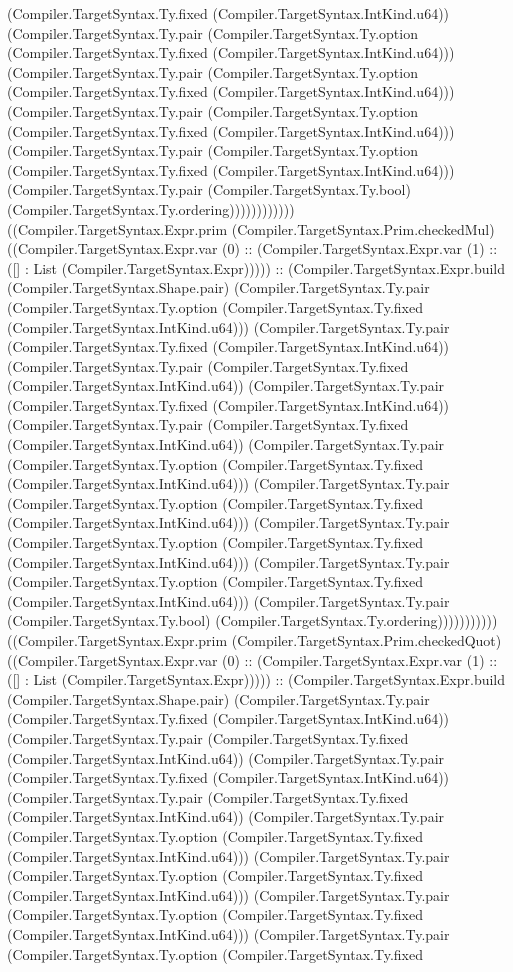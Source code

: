 \documentclass[11pt]{article}
\begin{document}
(Compiler.TargetSyntax.Ty.fixed (Compiler.TargetSyntax.IntKind.u64)) (Compiler.TargetSyntax.Ty.pair (Compiler.TargetSyntax.Ty.option (Compiler.TargetSyntax.Ty.fixed (Compiler.TargetSyntax.IntKind.u64))) (Compiler.TargetSyntax.Ty.pair (Compiler.TargetSyntax.Ty.option (Compiler.TargetSyntax.Ty.fixed (Compiler.TargetSyntax.IntKind.u64))) (Compiler.TargetSyntax.Ty.pair (Compiler.TargetSyntax.Ty.option (Compiler.TargetSyntax.Ty.fixed (Compiler.TargetSyntax.IntKind.u64))) (Compiler.TargetSyntax.Ty.pair (Compiler.TargetSyntax.Ty.option (Compiler.TargetSyntax.Ty.fixed (Compiler.TargetSyntax.IntKind.u64))) (Compiler.TargetSyntax.Ty.pair (Compiler.TargetSyntax.Ty.bool) (Compiler.TargetSyntax.Ty.ordering)))))))))))) ((Compiler.TargetSyntax.Expr.prim (Compiler.TargetSyntax.Prim.checkedMul) ((Compiler.TargetSyntax.Expr.var (0) :: (Compiler.TargetSyntax.Expr.var (1) :: ([] : List (Compiler.TargetSyntax.Expr))))) :: (Compiler.TargetSyntax.Expr.build (Compiler.TargetSyntax.Shape.pair) (Compiler.TargetSyntax.Ty.pair (Compiler.TargetSyntax.Ty.option (Compiler.TargetSyntax.Ty.fixed (Compiler.TargetSyntax.IntKind.u64))) (Compiler.TargetSyntax.Ty.pair (Compiler.TargetSyntax.Ty.fixed (Compiler.TargetSyntax.IntKind.u64)) (Compiler.TargetSyntax.Ty.pair (Compiler.TargetSyntax.Ty.fixed (Compiler.TargetSyntax.IntKind.u64)) (Compiler.TargetSyntax.Ty.pair (Compiler.TargetSyntax.Ty.fixed (Compiler.TargetSyntax.IntKind.u64)) (Compiler.TargetSyntax.Ty.pair (Compiler.TargetSyntax.Ty.fixed (Compiler.TargetSyntax.IntKind.u64)) (Compiler.TargetSyntax.Ty.pair (Compiler.TargetSyntax.Ty.option (Compiler.TargetSyntax.Ty.fixed (Compiler.TargetSyntax.IntKind.u64))) (Compiler.TargetSyntax.Ty.pair (Compiler.TargetSyntax.Ty.option (Compiler.TargetSyntax.Ty.fixed (Compiler.TargetSyntax.IntKind.u64))) (Compiler.TargetSyntax.Ty.pair (Compiler.TargetSyntax.Ty.option (Compiler.TargetSyntax.Ty.fixed (Compiler.TargetSyntax.IntKind.u64))) (Compiler.TargetSyntax.Ty.pair (Compiler.TargetSyntax.Ty.option (Compiler.TargetSyntax.Ty.fixed (Compiler.TargetSyntax.IntKind.u64))) (Compiler.TargetSyntax.Ty.pair (Compiler.TargetSyntax.Ty.bool) (Compiler.TargetSyntax.Ty.ordering))))))))))) ((Compiler.TargetSyntax.Expr.prim (Compiler.TargetSyntax.Prim.checkedQuot) ((Compiler.TargetSyntax.Expr.var (0) :: (Compiler.TargetSyntax.Expr.var (1) :: ([] : List (Compiler.TargetSyntax.Expr))))) :: (Compiler.TargetSyntax.Expr.build (Compiler.TargetSyntax.Shape.pair) (Compiler.TargetSyntax.Ty.pair (Compiler.TargetSyntax.Ty.fixed (Compiler.TargetSyntax.IntKind.u64)) (Compiler.TargetSyntax.Ty.pair (Compiler.TargetSyntax.Ty.fixed (Compiler.TargetSyntax.IntKind.u64)) (Compiler.TargetSyntax.Ty.pair (Compiler.TargetSyntax.Ty.fixed (Compiler.TargetSyntax.IntKind.u64)) (Compiler.TargetSyntax.Ty.pair (Compiler.TargetSyntax.Ty.fixed (Compiler.TargetSyntax.IntKind.u64)) (Compiler.TargetSyntax.Ty.pair (Compiler.TargetSyntax.Ty.option (Compiler.TargetSyntax.Ty.fixed (Compiler.TargetSyntax.IntKind.u64))) (Compiler.TargetSyntax.Ty.pair (Compiler.TargetSyntax.Ty.option (Compiler.TargetSyntax.Ty.fixed (Compiler.TargetSyntax.IntKind.u64))) (Compiler.TargetSyntax.Ty.pair (Compiler.TargetSyntax.Ty.option (Compiler.TargetSyntax.Ty.fixed (Compiler.TargetSyntax.IntKind.u64))) (Compiler.TargetSyntax.Ty.pair (Compiler.TargetSyntax.Ty.option (Compiler.TargetSyntax.Ty.fixed 
\end{document}
